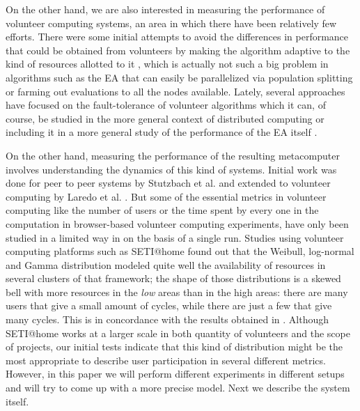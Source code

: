 \documentclass[journal,onecolumn]{IEEEtran}
\begin{document}
On the other hand, we are also interested in measuring the performance
of volunteer computing systems, an area in which there have been
relatively few efforts.
There were some initial attempts to avoid the differences in performance
that could be obtained from volunteers  by making
the algorithm adaptive to the kind of resources allotted to it
\cite{milani2004online}, which is actually not such a big problem in
algorithms such as the EA that can easily be
parallelized via population splitting or farming out evaluations to all
the nodes available. Lately, several approaches have focused on the
fault-tolerance of volunteer algorithms
\cite{gonzalez2010characterizing} which it can, of course, be studied in
the more general context of distributed computing 
\cite{nogueras2015studying} or including it in a more general study of the
performance of the EA itself
\cite{DBLP:journals/gpem/LaredoBGVAGF14}.

On the other hand, measuring the performance of the resulting metacomputer
involves understanding the dynamics of this kind of systems. Initial
work was done for peer to peer systems by Stutzbach et
al. \cite{stutzbach2006understanding} and extended to volunteer
computing by Laredo et al. \cite{churn08,laredo2008rcp}. 
But some of the essential metrics in volunteer computing like the
number of users or the time spent by every one in the
computation in browser-based volunteer computing experiments, have
only been studied in a limited way in 
\cite{DBLP:journals/gpem/LaredoBGVAGF14} on the basis of a single
run. Studies using volunteer computing platforms such as SETI@home
\cite{javadi2009mining} found out that the Weibull, log-normal and
Gamma distribution 
modeled quite well the availability of resources in several clusters
of that framework; the shape of those distributions is a skewed bell
with more resources in the {\em low} areas than in the high areas:
there are many users that give a small amount of cycles, while there
are just a few that give many cycles. This is in concordance with the
results obtained in \cite{agajaj}. Although SETI@home works
at a larger scale in both quantity of volunteers and the scope of projects, 
our initial tests indicate that
this kind of distribution might be the most appropriate to describe
user participation in several different metrics. However, in this
paper we will perform different experiments in different setups and
will try to come up with a more precise model. Next we describe the
system itself.
\end{document}
